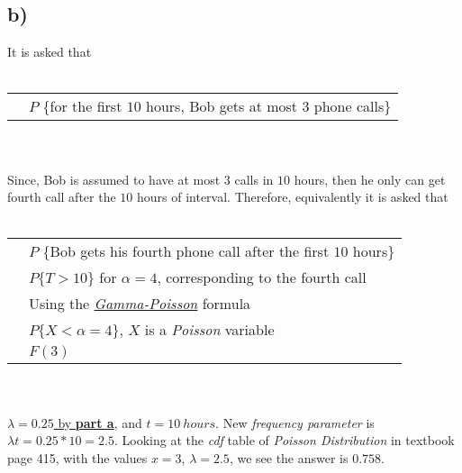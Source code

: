\documentclass[12pt]{article}
\begin{document}
\subsection*{b)}
It is asked that
\\ \\
\begin{tabular}{l l}
    & $P$ \{for the first $10$ hours, Bob gets at most $3$ phone calls\}\\
\end{tabular}
\\ \\
Since, Bob is assumed to have at most $3$ calls in $10$ hours, then 
he only can get fourth call after the $10$ hours of interval. Therefore, equivalently
it is asked that
\\ \\
\begin{tabular}{l l}
    & $P$ \{Bob gets his fourth phone call after the first $10$ hours\}\\
    & $P \{T>10\}$ for $\alpha=4$, corresponding to the fourth call\\
    & Using the \hyperlink{g-p}{\textit{Gamma-Poisson}} formula\\
    & $P \{X<\alpha=4\}$, $X$ is a \textit{Poisson} variable\\
    & $F(3)$\\
\end{tabular}
\\ \\
\hyperlink{lambda}{$\lambda=0.25$ by \textbf{part a}}, and $t=10\ hours$.
New \textit{frequency parameter} is $\lambda t=0.25*10=2.5$.
Looking at the \textit{cdf} table of \textit{Poisson Distribution} in \hypertarget{lambdab}{textbook} page 415, 
with the values $x=3$, $\lambda=2.5$, we see the answer is $0.758$.
\end{document}
